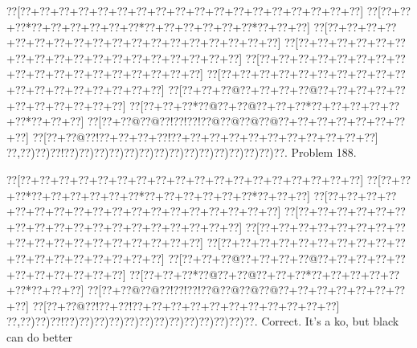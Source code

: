 \documentclass[a5paper]{article}
\begin{document}
\newpage
\begin{center}
{\goo
\0??[\0??+\0??+\0??+\0??+\0??+\0??+\0??+\0??+\0??+\0??+\0??+\0??+\0??+\0??+\0??+\0??+\0??+\0??]
\0??[\0??+\0??+\0??*\0??+\0??+\0??+\0??+\0??+\0??*\0??+\0??+\0??+\0??+\0??+\0??*\0??+\0??+\0??]
\0??[\0??+\0??+\0??+\0??+\0??+\0??+\0??+\0??+\0??+\0??+\0??+\0??+\0??+\0??+\0??+\0??+\0??+\0??]
\0??[\0??+\0??+\0??+\0??+\0??+\0??+\0??+\0??+\0??+\0??+\0??+\0??+\0??+\0??+\0??+\0??+\0??+\0??]
\0??[\0??+\0??+\0??+\0??+\0??+\0??+\0??+\0??+\0??+\0??+\0??+\0??+\0??+\0??+\0??+\0??+\0??+\0??]
\0??[\0??+\0??+\0??+\0??+\0??+\0??+\0??+\0??+\0??+\0??+\0??+\0??+\0??+\0??+\0??+\0??+\0??+\0??]
\0??[\0??+\0??+\0??@\0??+\0??+\0??+\0??@\0??+\0??+\0??+\0??+\0??+\0??+\0??+\0??+\0??+\0??+\0??]
\0??[\0??+\0??+\0??*\0??@\0??+\0??@\0??+\0??+\0??*\0??+\0??+\0??+\0??+\0??+\0??*\0??+\0??+\0??]
\0??[\0??+\0??@\0??@\0??!\0??!\0??!\0??@\0??@\0??@\0??@\0??+\0??+\0??+\0??+\0??+\0??+\0??+\0??]
\0??[\0??+\0??@\0??!\0??+\0??+\0??+\0??!\0??+\0??+\0??+\0??+\0??+\0??+\0??+\0??+\0??+\0??+\0??]
\0??,\0??)\0??)\0??!\0??)\0??)\0??)\0??)\0??)\0??)\0??)\0??)\0??)\0??)\0??)\0??)\0??)\0??)\0??.
}
Problem 188.

\end{center}
\begin{center}
{\goo
\0??[\0??+\0??+\0??+\0??+\0??+\0??+\0??+\0??+\0??+\0??+\0??+\0??+\0??+\0??+\0??+\0??+\0??+\0??]
\0??[\0??+\0??+\0??*\0??+\0??+\0??+\0??+\0??+\0??*\0??+\0??+\0??+\0??+\0??+\0??*\0??+\0??+\0??]
\0??[\0??+\0??+\0??+\0??+\0??+\0??+\0??+\0??+\0??+\0??+\0??+\0??+\0??+\0??+\0??+\0??+\0??+\0??]
\0??[\0??+\0??+\0??+\0??+\0??+\0??+\0??+\0??+\0??+\0??+\0??+\0??+\0??+\0??+\0??+\0??+\0??+\0??]
\0??[\0??+\0??+\0??+\0??+\0??+\0??+\0??+\0??+\0??+\0??+\0??+\0??+\0??+\0??+\0??+\0??+\0??+\0??]
\0??[\0??+\0??+\0??+\0??+\0??+\0??+\0??+\0??+\0??+\0??+\0??+\0??+\0??+\0??+\0??+\0??+\0??+\0??]
\0??[\0??+\0??+\0??@\0??+\0??+\0??+\0??@\0??+\0??+\0??+\0??+\0??+\0??+\0??+\0??+\0??+\0??+\0??]
\0??[\0??+\0??+\0??*\0??@\0??+\0??@\0??+\0??+\0??*\0??+\0??+\0??+\0??+\0??+\0??*\0??+\0??+\0??]
\0??[\0??+\0??@\0??@\0??!\0??!\0??!\0??@\0??@\0??@\0??@\0??+\0??+\0??+\0??+\0??+\0??+\0??+\0??]
\0??[\0??+\0??@\0??!\0??+\0??!\0??+\0??+\0??+\0??+\0??+\0??+\0??+\0??+\0??+\0??+\0??]
\0??,\0??)\0??)\0??!\0??)\0??)\0??)\0??)\0??)\0??)\0??)\0??)\0??)\0??)\0??)\0??)\0??.
}
Correct. It's a ko, but black can do better

\end{center}
\end{document}
